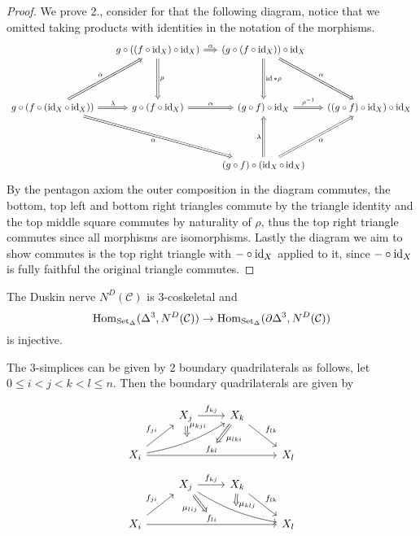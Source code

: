 \begin{proof}
	We prove 2., consider for that the following diagram, notice that we omitted taking products with identities in the notation of the morphisms. 
	\[
	\begin{tikzcd}[row sep= 1.5cm, column sep= 0.5cm]
		&
		g \circ ( ( f \circ \id_X ) \circ \id_X ) 
		\ar[r, Rightarrow, "\alpha"]
		\ar[d, Rightarrow, "\rho"]
		&
		( g \circ ( f \circ \id_X ) ) \circ \id_X 
		\ar[d, Rightarrow, "\id * \rho"] 
		\ar[rd, Rightarrow, "\alpha"]
		\\
		g \circ ( f \circ ( \id_X \circ \id_X ) ) 
		\ar[r, Rightarrow, "\lambda"]
		\ar[rrd, Rightarrow, "\alpha"']
		\ar[ru, Rightarrow, "\alpha"]
		&
		g \circ ( f \circ \id_X )
		\ar[r, Rightarrow, "\alpha"] 
		&
		( g \circ f ) \circ \id_X 
		\ar[r, Rightarrow, " \rho^{ - 1 }"]
		&
		( ( g \circ f ) \circ \id_X ) \circ \id_X 
		\\
		& &
		( g \circ f ) \circ ( \id_X \circ \id_X )
		\ar[u, Rightarrow, "\lambda"]
		\ar[ru, Rightarrow, "\alpha"']
	\end{tikzcd}
	\]
	By the pentagon axiom the outer composition in the diagram commutes, the bottom, top left and bottom right triangles commute by the triangle identity and the top middle square commutes by naturality of $ \rho $, thus the top right triangle commutes since all morphisms are isomorphisms.
	Lastly the diagram we aim to show commutes is the top right triangle with $ - \circ \operatorname{id}_X $ applied to it, since $ - \circ \operatorname{id}_X $ is fully faithful the original triangle commutes.
\end{proof}

\begin{cor}
	The Duskin nerve $ N^D ( \mathcal{ C } ) $ is 3-coskeletal and 
	\[
	 	\operatorname{Hom}_{ \operatorname{Set}_{\Delta} } ( \Delta^3 , N^D ( \mathcal{ C } ) ) \to \operatorname{Hom}_{ \operatorname{Set}_{\Delta} } ( \partial \Delta^3 , N^D ( \mathcal{ C } ) ) 
	\]
  	is injective.
\end{cor}

The 3-simplices can be given by 2 boundary quadrilaterals as follows, let $ 0 \leq i < j < k < l \leq n $.
Then the boundary quadrilaterals are given by

\[
\begin{tikzcd}
	&
	X_j
	\ar[r , " f_{ k j } " ]
	&
	X_k
	\ar[rd, "f_{ l k } "]
	\\
	X_i
	\ar[rru,bend right=10,""{name=U, above}]
	\ar[ru, " f_{ j i } " ]
	\ar[rrr, " f_{ k l } "' {name=R, above}]
	\arrow[Rightarrow, from=ru, to=U, "\mu_{ k j i } "]
	&&&
	X_l
	\ar[Rightarrow, from=ul, to=R, "\mu_{ l k i } "]
\end{tikzcd}
\]
\[
\begin{tikzcd}
	&
	X_j
	\ar[r , " f_{ k j } " ]
	\ar[rrd, bend right=10,""{name=D, above}]
	&
	X_k
	\ar[rd, "f_{ l k } "]
	\ar[Rightarrow, to=D, "\mu_{ k l j } "]
	\\
	X_i
	\ar[ru, " f_{ j i } " ]
	\ar[rrr, " f_{ l i } "' {name=L, above}]
	\ar[Rightarrow, from=ur, to=L, "\mu_{ l i j } "']
	&&&
	X_l
\end{tikzcd}
\]

